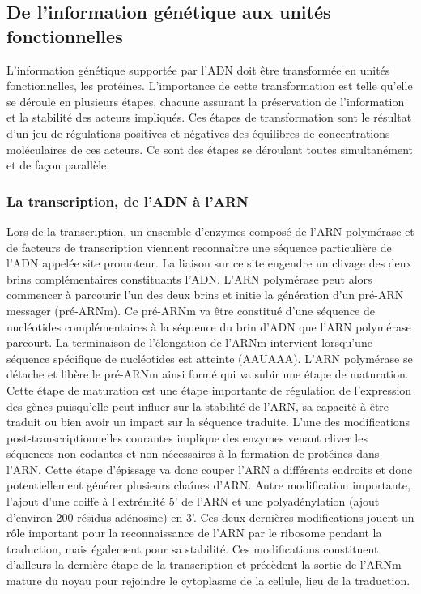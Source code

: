 \subsection{De l'information génétique aux unités fonctionnelles} \label{trans_trad}

L'information génétique supportée par l'ADN doit être transformée en unités fonctionnelles, les protéines. L'importance de cette transformation est telle qu'elle se déroule en plusieurs étapes, chacune assurant la préservation de l'information et la stabilité des acteurs impliqués. Ces étapes de transformation sont le résultat d'un jeu de régulations positives et négatives des équilibres de concentrations moléculaires de ces acteurs. Ce sont des étapes se déroulant toutes simultanément et de façon parallèle.

\subsubsection{La transcription, de l'ADN à l'ARN}

Lors de la transcription, un ensemble d'enzymes composé de l'ARN polymérase et de facteurs de transcription viennent reconnaître une séquence particulière de l'ADN appelée site promoteur. La liaison sur ce site engendre un clivage des deux brins complémentaires constituants l'ADN. L'ARN polymérase peut alors commencer à parcourir l'un des deux brins et initie la génération d'un pré-ARN messager (pré-ARNm). Ce pré-ARNm va être constitué d'une séquence de nucléotides complémentaires à la séquence du brin d'ADN que l'ARN polymérase parcourt. La terminaison de l'élongation de l'ARNm intervient lorsqu’une séquence spécifique de nucléotides est atteinte (AAUAAA). L'ARN polymérase se détache et libère le pré-ARNm ainsi formé qui va subir une étape de maturation. Cette étape de maturation est une étape importante de régulation de l'expression des gènes puisqu'elle peut influer sur la stabilité de l'ARN, sa capacité à être traduit ou bien avoir un impact sur la séquence traduite. L'une des modifications post-transcriptionnelles courantes implique des enzymes venant cliver les séquences non codantes et non nécessaires à la formation de protéines dans l'ARN. Cette étape d'épissage va donc couper l'ARN a différents endroits et donc potentiellement générer plusieurs chaînes d'ARN. Autre modification importante, l'ajout d'une coiffe à l'extrémité 5' de l'ARN et une polyadénylation (ajout d'environ 200 résidus adénosine) en 3'. Ces deux dernières modifications jouent un rôle important pour la reconnaissance de l'ARN par le ribosome pendant la traduction, mais également pour sa stabilité. Ces modifications constituent d'ailleurs la dernière étape de la transcription et précèdent la sortie de l'ARNm mature du noyau pour rejoindre le cytoplasme de la cellule, lieu de la traduction.

